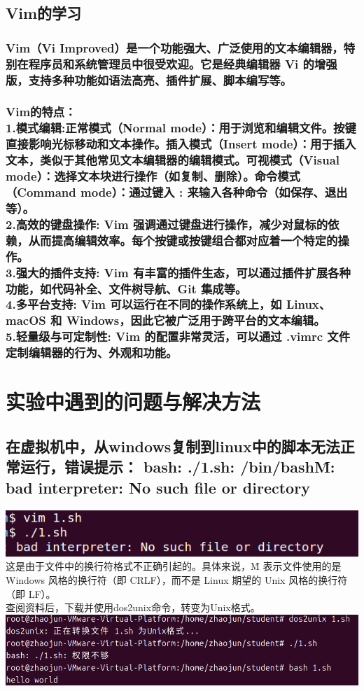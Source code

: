 \documentclass[UTF8,a4paper]{ctexart}
\begin{document}
\begin{sloppypar}
	\subsection{Vim的学习}
	\subsubsection{Vim（Vi Improved）是一个功能强大、广泛使用的文本编辑器，特别在程序员和系统管理员中很受欢迎。它是经典编辑器 Vi 的增强版，支持多种功能如语法高亮、插件扩展、脚本编写等。}
	\subsubsection{Vim的特点：\\1.模式编辑:正常模式（Normal mode）：用于浏览和编辑文件。按键直接影响光标移动和文本操作。插入模式（Insert mode）：用于插入文本，类似于其他常见文本编辑器的编辑模式。可视模式（Visual mode）：选择文本块进行操作（如复制、删除）。命令模式（Command mode）：通过键入 : 来输入各种命令（如保存、退出等）。
\\2.高效的键盘操作: Vim 强调通过键盘进行操作，减少对鼠标的依赖，从而提高编辑效率。每个按键或按键组合都对应着一个特定的操作。\\3.强大的插件支持: Vim 有丰富的插件生态，可以通过插件扩展各种功能，如代码补全、文件树导航、Git 集成等。\\4.多平台支持: Vim 可以运行在不同的操作系统上，如 Linux、macOS 和 Windows，因此它被广泛用于跨平台的文本编辑。\\5.轻量级与可定制性: Vim 的配置非常灵活，可以通过 .vimrc 文件定制编辑器的行为、外观和功能。}
	

	\bigskip
	\bigskip
	\bigskip
	\bigskip
	\graphicspath{{picture/}}
	
	\newpage

	\section{实验中遇到的问题与解决方法}
	\subsection{在虚拟机中，从windows复制到linux中的脚本无法正常运行，错误提示： bash: ./1.sh: /bin/bash\^M: bad interpreter: No such file or directory}
	\includegraphics[width = 16cm]{q1}
	 这是由于文件中的换行符格式不正确引起的。具体来说，\^M 表示文件使用的是 Windows 风格的换行符（即 CRLF），而不是 Linux 期望的 Unix 风格的换行符（即 LF）。\\查阅资料后，下载并使用dos2unix命令，转变为Unix格式。\\
	 \includegraphics[width = 16cm]{q2}


\end{sloppypar}
\end{document}
